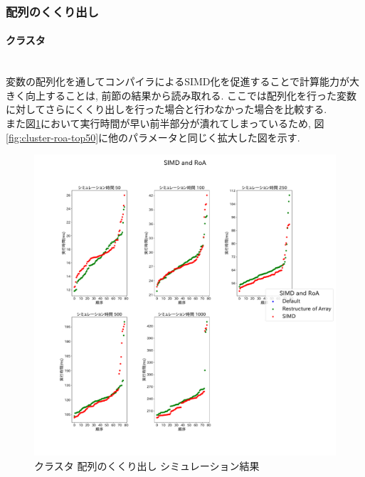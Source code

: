 \subsubsection{配列のくくり出し}
\paragraph{クラスタ}~\\
変数の配列化を通してコンパイラによるSIMD化を促進することで計算能力が大きく向上することは,
前節の結果から読み取れる. ここでは配列化を行った変数に対してさらにくくり出しを行った場合と行わなかった場合を比較する.\\
また図\ref{fig:cluster-roa}において実行時間が早い前半部分が潰れてしまっているため,
図\ref{fig:cluster-roa-top50}に他のパラメータと同じく拡大した図を示す.\\
\begin{figure}[htb]
\begin{center}
    \includegraphics[width=14cm]{./images/cluster-SIMD-and-RoA.pdf}
    \caption{クラスタ 配列のくくり出し シミュレーション結果}
    \label{fig:cluster-roa}
\end{center}
\end{figure}

